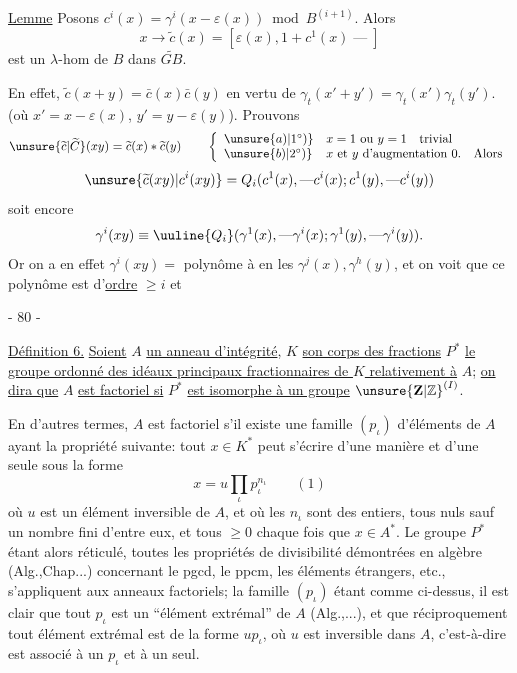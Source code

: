  \uline{Lemme} Posons $c^i(x)=\gamma^i(x-\varepsilon(x))\bmod B^{(i+1)}$. Alors
\[
x\longrightarrow\widetilde c(x)=[\varepsilon(x),1+c^1(x)\mathbin{\text{---}}]
\]
est un $\lambda$-hom de $B$ dans $\widetilde{GB}$.

En effet, $\widetilde c(x+y)=\bar c(x)\bar c(y)$ en vertu de $\gamma_t(x'+y')=\gamma_t(x')\gamma_t(y')$.
(où $x'=x-\varepsilon(x)$, $y'=y-\varepsilon(y)$). Prouvons
\[
\unsure{\widetilde c|\widetilde C}(xy)=\widetilde c(x)*\widetilde c(y)
\qquad
\left\{\begin{array}{ll}
\unsure{a)|1^\circ)} & x=1\text{ ou }y=1\quad\text{trivial}\\
\unsure{b)|2^\circ)} & x\text{ et }y\text{ d'augmentation }0.\quad\text{Alors}
\end{array}\right.
\]
\[
\unsure{\widetilde c(xy)|c^i(xy)}=Q_i(c^1(x),\mathbin{\text{---}}c^i(x);c^1(y),\mathbin{\text{---}}c^i(y))
\]
soit encore 
\[
\gamma^i(xy)\equiv\uuline{Q_i}(\gamma^1(x),\mathbin{\text{---}}\gamma^i(x);\gamma^1(y),\mathbin{\text{---}}\gamma^i(y)).
\]
Or on a en effet $\gamma^i(xy)=$ polynôme à  en les $\gamma^j(x),\gamma^h(y)$, et on voit  que ce polynôme est d'\uline{ordre} $\geq i$ et 
\begin{center}- 80 -\end{center}

\uline{Définition 6.} \uline{Soient} $A$ \uline{un anneau d'intégrité}, $K$ \uline{son corps des fractions}
$P^*$ \uline{le groupe ordonné des idéaux principaux fractionnaires de $K$ relativement à} $A$; \uline{on dira que} $A$ \uline{est factoriel si} $P^*$ \uline{est isomorphe à un groupe} $\unsure{\mathbf Z|\mathbb Z}^{(I)}$.

En d'autres termes, $A$ est factoriel s'il existe une famille $(p_\iota)$ d'éléments de $A$ ayant la propriété suivante: tout $x\in K^*$ peut s'écrire d'une manière et d'une seule sous la forme
\[
x=u\prod_\iota p_\iota^{n_\iota}\qquad(1)
\]
où $u$ est un élément inversible de $A$, et où les $n_\iota$ sont des entiers, tous nuls sauf un nombre fini d'entre eux, et tous $\geq0$ chaque fois que $x\in A^*$. Le groupe $P^*$ étant alors réticulé, toutes les propriétés de divisibilité démontrées en algèbre (Alg.,Chap...) concernant le pgcd, le ppcm, les éléments étrangers, etc., s'appliquent aux anneaux factoriels; la famille $(p_\iota)$ étant comme ci-dessus, il est clair que tout $p_\iota$ est un ``élément extrémal'' de $A$ (Alg.,...), et que réciproquement tout élément extrémal est de la forme $up_\iota$, où $u$ est inversible dans $A$, c'est-à-dire est associé à un $p_\iota$ et à un seul.

